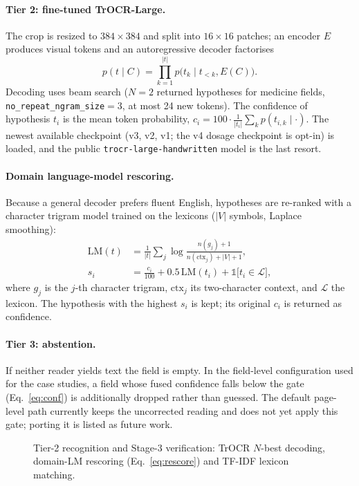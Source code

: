 \documentclass[journal]{IEEEtran}
\begin{document}
\paragraph{Tier 2: fine-tuned TrOCR-Large.} The crop is resized to $384{\times}384$ and split into $16{\times}16$ patches; an encoder $E$ produces visual tokens and an autoregressive decoder factorises
\begin{equation}
p(t\mid C)=\prod_{k=1}^{|t|}p\bigl(t_k\mid t_{<k},E(C)\bigr).
\end{equation}
Decoding uses beam search ($N{=}2$ returned hypotheses for medicine fields, \texttt{no\_repeat\_ngram\_size}$=3$, at most 24 new tokens). The confidence of hypothesis $t_i$ is the mean token probability, $c_i=100\cdot\frac{1}{|t_i|}\sum_k p(t_{i,k}\mid\cdot)$. The newest available checkpoint (v3, v2, v1; the v4 dosage checkpoint is opt-in) is loaded, and the public \texttt{trocr-large-handwritten} model is the last resort.

\paragraph{Domain language-model rescoring.} Because a general decoder prefers fluent English, hypotheses are re-ranked with a character trigram model trained on the lexicons ($|V|$ symbols, Laplace smoothing):
\begin{align}
\mathrm{LM}(t)&=\frac{1}{|t|}\sum_{j}\log\frac{n(g_j)+1}{n(\mathrm{ctx}_j)+|V|+1},\\
s_i&=\frac{c_i}{100}+0.5\,\mathrm{LM}(t_i)+\mathbb{1}\bigl[t_i\in\mathcal{L}\bigr],
\label{eq:rescore}
\end{align}
where $g_j$ is the $j$-th character trigram, $\mathrm{ctx}_j$ its two-character context, and $\mathcal{L}$ the lexicon. The hypothesis with the highest $s_i$ is kept; its original $c_i$ is returned as confidence.

\paragraph{Tier 3: abstention.} If neither reader yields text the field is empty. In the field-level configuration used for the case studies, a field whose fused confidence falls below the gate (Eq.~\ref{eq:conf}) is additionally dropped rather than guessed. The default page-level path currently keeps the uncorrected reading and does not yet apply this gate; porting it is listed as future work.

\begin{figure}[t]
\centering
\resizebox{0.95\textwidth}{!}{}
\caption{Tier-2 recognition and Stage-3 verification: TrOCR $N$-best decoding, domain-LM rescoring (Eq.~\ref{eq:rescore}) and TF-IDF lexicon matching.}
\label{fig:recognition}
\end{figure}
\end{document}
